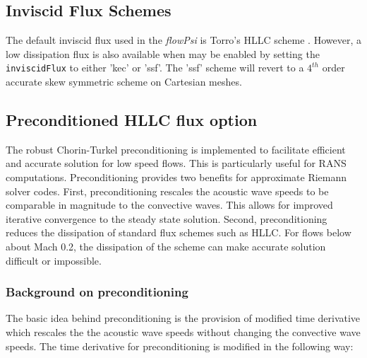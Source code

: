 \subsection{Inviscid Flux Schemes}

The default inviscid flux used in the {\it flowPsi} is Torro's HLLC
scheme \cite{Torro.1994}.  However, a low dissipation flux is also
available when may be enabled by setting the {\tt inviscidFlux} to
either 'kec' or 'ssf'.  The 'ssf' scheme will revert to a $4^{th}$
order accurate skew symmetric scheme on Cartesian meshes.

\subsection{Preconditioned HLLC flux option}

The robust Chorin-Turkel preconditioning is implemented to facilitate
efficient and accurate solution for low speed flows.  This is
particularly useful for RANS computations.  Preconditioning provides
two benefits for approximate Riemann solver codes.  First,
preconditioning rescales the acoustic wave speeds to be comparable in
magnitude to the convective waves.  This allows for improved iterative
convergence to the steady state solution.  Second, preconditioning
reduces the dissipation of standard flux schemes such as HLLC.  For
flows below about Mach 0.2, the dissipation of the scheme can make
accurate solution difficult or impossible.

\subsubsection{Background on preconditioning}

The basic idea behind preconditioning is the provision of modified
time derivative which rescales the the acoustic wave speeds without
changing the convective wave speeds.  The time derivative for preconditioning is modified in the following way:

